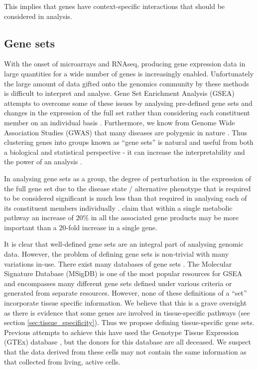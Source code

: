 \documentclass[11pt]{article} %
\begin{document}
	This implies that genes have context-specific interactions that should be considered in analysis.
	
	\subsection{Gene sets}
	With the onset of microarrays and RNAseq, producing gene expression data in large quantities for a wide number of genes is increasingly enabled. Unfortunately the large amount of data gifted onto the genomics community by these methods is difficult to interpret and analyse. Gene Set Enrichment Analysis (GSEA) attempts to overcome some of these issues by analysing pre-defined gene sets and changes in the expression of the full set rather than considering each constituent member on an individual basis \cite{mooney_gene_2015}. Furthermore, we know from Genome Wide Association Studies (GWAS) that many diseases are polygenic in nature \cite{mooney_gene_2015}. Thus clustering genes into groups known as ``gene sets'' is natural and useful from both a biological and statistical perspective - it can increase the interpretability and the power of an analysis \cite{nica_expression_2013}\cite{vosa_unraveling_2018}.
	
	In analysing gene sets as a group, the degree of perturbation in the expression of the full gene set due to the disease state / alternative phenotype that is required to be considered significant is much less than that required in analysing each of its constituent members individually \cite{dudbridge_power_2013}\cite{wray_research_2014}. \citet{subramanian_gene_2005} claim that within a single metabolic pathway an increase of $20\%$ in all the associated gene products may be more important than a 20-fold increase in a single gene.
	
	It is clear that well-defined gene sets are an integral part of analysing genomic data. However, the problem of defining gene sets is non-trivial with many variations in-use. There exist many databases of gene sets \cite{ashburner_gene_2000}\cite{kanehisa_new_2019}\cite{szklarczyk_string_2019}. The Molecular Signature Database \cite{subramanian_gene_2005} (MSigDB) is one of the most popular resources for GSEA and encompasses many different gene sets defined under various criteria or generated from separate resources. However, none of these definitions of a ``set'' incorporate tissue specific information. We believe that this is a grave oversight as there is evidence that some genes are involved in tissue-specific pathways (see section \ref{sec:tissue_specificity}). Thus we propose defining tissue-specific gene sets. Previous attempts to achieve this have used the Genotype Tissue Expression (GTEx) database \cite{gtex_consortium_genetic_2017}\cite{lonsdale_genotype-tissue_2013}, but the donors for this database are all deceased. We suspect that the data derived from these cells may not contain the same information as that collected from living, active cells.
		
\end{document}
